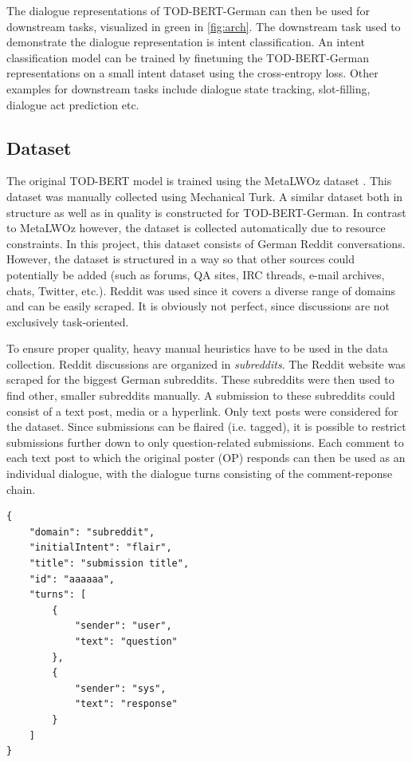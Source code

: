 \documentclass{article}
\begin{document}
The dialogue representations of TOD-BERT-German can then be used for downstream tasks, visualized in green in \autoref{fig:arch}. The downstream task used to demonstrate the dialogue representation is intent classification. An intent classification model can be trained by finetuning the TOD-BERT-German representations on a small intent dataset using the cross-entropy loss. Other examples for downstream tasks include dialogue state tracking, slot-filling, dialogue act prediction etc.

\subsection{Dataset}
The original TOD-BERT model is trained using the MetaLWOz dataset \cite{lee2019multi-domain}. This dataset was manually collected using Mechanical Turk. A similar dataset both in structure as well as in quality is constructed for TOD-BERT-German. In contrast to MetaLWOz however, the dataset is collected automatically due to resource constraints. In this project, this dataset consists of German Reddit conversations. However, the dataset is
structured in a way so that other sources could potentially be added (such as forums, QA sites, IRC threads, e-mail archives, chats, Twitter, etc.). Reddit was used since it covers a diverse range of domains and can be easily scraped. It is obviously not perfect, since discussions are not exclusively task-oriented.

To ensure proper quality, heavy manual heuristics have to be used in the data collection. Reddit discussions are organized in \textit{subreddits}. The Reddit website was scraped for the biggest German subreddits. These subreddits were then used to find other, smaller subreddits manually. A submission to these subreddits could consist of a text post, media or a hyperlink. Only text posts were considered for the dataset. Since submissions can be flaired (i.e. tagged), it is possible to restrict submissions further down to only question-related submissions. Each comment to each text post to which the original poster (OP) responds can then be used as an individual dialogue, with the dialogue turns consisting of the comment-reponse chain.

\begin{verbatim}
{
	"domain": "subreddit",
	"initialIntent": "flair",
	"title": "submission title",
	"id": "aaaaaa",
	"turns": [
		{
			"sender": "user",
			"text": "question"
		},
		{
			"sender": "sys",
			"text": "response"
		}
	]
}
\end{verbatim}
\end{document}
